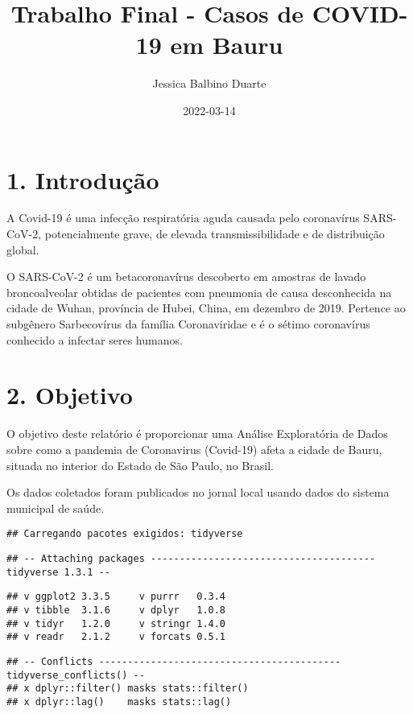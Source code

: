 \documentclass[
]{article}
\title{Trabalho Final - Casos de COVID-19 em Bauru}
\author{Jessica Balbino Duarte}
\date{2022-03-14}
\begin{document}
\maketitle

\hypertarget{introduuxe7uxe3o}{%
\section{1. Introdução}\label{introduuxe7uxe3o}}

A Covid-19 é uma infecção respiratória aguda causada pelo coronavírus
SARS-CoV-2, potencialmente grave, de elevada transmissibilidade e de
distribuição global.

O SARS-CoV-2 é um betacoronavírus descoberto em amostras de lavado
broncoalveolar obtidas de pacientes com pneumonia de causa desconhecida
na cidade de Wuhan, província de Hubei, China, em dezembro de 2019.
Pertence ao subgênero Sarbecovírus da família Coronaviridae e é o sétimo
coronavírus conhecido a infectar seres humanos.

\hypertarget{objetivo}{%
\section{2. Objetivo}\label{objetivo}}

O objetivo deste relatório é proporcionar uma Análise Exploratória de
Dados sobre como a pandemia de Coronavirus (Covid-19) afeta a cidade de
Bauru, situada no interior do Estado de São Paulo, no Brasil.

Os dados coletados foram publicados no jornal local usando dados do
sistema municipal de saúde.

\begin{verbatim}
## Carregando pacotes exigidos: tidyverse
\end{verbatim}

\begin{verbatim}
## -- Attaching packages --------------------------------------- tidyverse 1.3.1 --
\end{verbatim}

\begin{verbatim}
## v ggplot2 3.3.5     v purrr   0.3.4
## v tibble  3.1.6     v dplyr   1.0.8
## v tidyr   1.2.0     v stringr 1.4.0
## v readr   2.1.2     v forcats 0.5.1
\end{verbatim}

\begin{verbatim}
## -- Conflicts ------------------------------------------ tidyverse_conflicts() --
## x dplyr::filter() masks stats::filter()
## x dplyr::lag()    masks stats::lag()
\end{verbatim}
\end{document}
